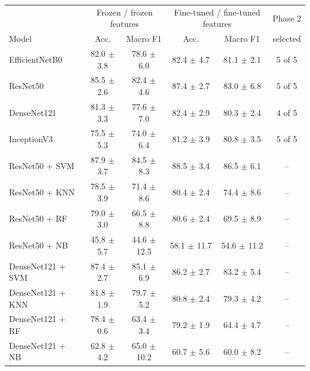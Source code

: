 \begin{tabular}{lccccc}
\toprule
 & \multicolumn{2}{c}{Frozen / frozen features} & \multicolumn{2}{c}{Fine-tuned / fine-tuned features} & Phase 2 \\
Model & Acc. & Macro F1 & Acc. & Macro F1 & selected \\
\midrule
EfficientNetB0 & 82.0 $\pm$ 3.8 & 78.6 $\pm$ 6.0 & 82.4 $\pm$ 4.7 & 81.1 $\pm$ 2.1 & 5 of 5 \\
ResNet50 & 85.5 $\pm$ 2.6 & 82.4 $\pm$ 4.6 & 87.4 $\pm$ 2.7 & 83.0 $\pm$ 6.8 & 5 of 5 \\
DenseNet121 & 81.3 $\pm$ 3.3 & 77.6 $\pm$ 7.0 & 82.4 $\pm$ 2.9 & 80.3 $\pm$ 2.4 & 4 of 5 \\
InceptionV3 & 75.5 $\pm$ 5.3 & 74.0 $\pm$ 6.4 & 81.2 $\pm$ 3.9 & 80.8 $\pm$ 3.5 & 5 of 5 \\
\midrule
ResNet50 + SVM & 87.9 $\pm$ 3.7 & 84.5 $\pm$ 8.3 & 88.5 $\pm$ 3.4 & 86.5 $\pm$ 6.1 & -- \\
ResNet50 + KNN & 78.5 $\pm$ 3.9 & 71.4 $\pm$ 8.6 & 80.4 $\pm$ 2.4 & 74.4 $\pm$ 8.6 & -- \\
ResNet50 + RF & 79.0 $\pm$ 3.0 & 66.5 $\pm$ 8.8 & 80.6 $\pm$ 2.4 & 69.5 $\pm$ 8.9 & -- \\
ResNet50 + NB & 45.8 $\pm$ 5.7 & 44.6 $\pm$ 12.5 & 58.1 $\pm$ 11.7 & 54.6 $\pm$ 11.2 & -- \\
DenseNet121 + SVM & 87.4 $\pm$ 2.7 & 85.1 $\pm$ 6.9 & 86.2 $\pm$ 2.7 & 83.2 $\pm$ 5.4 & -- \\
DenseNet121 + KNN & 81.8 $\pm$ 1.9 & 79.7 $\pm$ 5.2 & 80.8 $\pm$ 2.4 & 79.3 $\pm$ 4.2 & -- \\
DenseNet121 + RF & 78.4 $\pm$ 0.6 & 63.4 $\pm$ 3.4 & 79.2 $\pm$ 1.9 & 64.4 $\pm$ 4.7 & -- \\
DenseNet121 + NB & 62.8 $\pm$ 4.2 & 65.0 $\pm$ 10.2 & 60.7 $\pm$ 5.6 & 60.0 $\pm$ 8.2 & -- \\
\bottomrule
\end{tabular}
